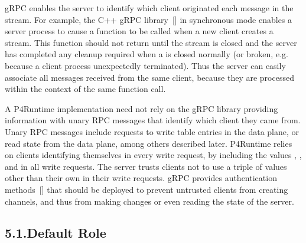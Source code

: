 \documentclass[11pt]{article}
\begin{document}
{%
\noindent{}gRPC enables the server to identify which client originated each message in the
 stream. For example, the C++ gRPC library~[] in
synchronous mode enables a server process to cause a function to be called when
a new client creates a  stream. This function should not return
until the stream is closed and the server has completed any cleanup required
when a  is closed normally (or broken, e.g. because a client
process unexpectedly terminated). Thus the server can easily associate all
 messages received from the same client, because they are
processed within the context of the same function call.%

A P4Runtime implementation need not rely on the gRPC library providing
information with unary RPC messages that identify which client they came from.
Unary RPC messages include requests to write table entries in the data plane, or
read state from the data plane, among others described later. P4Runtime relies
on clients identifying themselves in every write request, by including the
values , , and  in all write requests. The
server trusts clients not to use a triple of values other than their own in
their write requests. gRPC provides authentication methods~[] that
should be deployed to prevent untrusted clients from creating channels, and thus
from making changes or even reading the state of the server.%

\subsection{5.1.\hspace*{0.5em}Default Role}\label{sec-default-role}%

}
\end{document}
